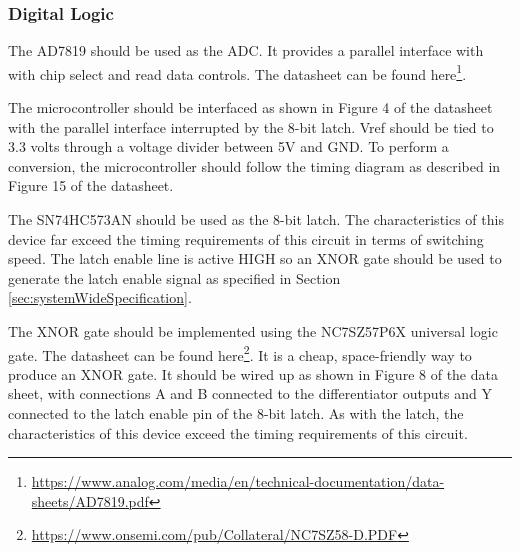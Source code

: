 \subsubsection{Digital Logic}
The AD7819 should be used as the ADC.
It provides a parallel interface with with chip select and read data controls. 
The datasheet can be found here\footnote{\url{https://www.analog.com/media/en/technical-documentation/data-sheets/AD7819.pdf}}.

The microcontroller should be interfaced as shown in Figure 4 of the datasheet with the parallel interface interrupted by the 8-bit latch.
Vref should be tied to 3.3 volts through a voltage divider between 5V and GND. 
To perform a conversion, the microcontroller should follow the timing diagram as described in Figure 15 of the datasheet. 

The SN74HC573AN should be used as the 8-bit latch. 
The characteristics of this device far exceed the timing requirements of this circuit in terms of switching speed. 
The latch enable line is active HIGH so an XNOR gate should be used to generate the latch enable signal as specified in Section \ref{sec:systemWideSpecification}.

The XNOR gate should be implemented using the NC7SZ57P6X universal logic gate. 
The datasheet can be found here\footnote{\url{https://www.onsemi.com/pub/Collateral/NC7SZ58-D.PDF}}.
It is a cheap, space-friendly way to produce an XNOR gate.
It should be wired up as shown in Figure 8 of the data sheet, with connections A and B connected to the differentiator outputs and Y connected to the latch enable pin of the 8-bit latch. 
As with the latch, the characteristics of this device exceed the timing requirements of this circuit.
